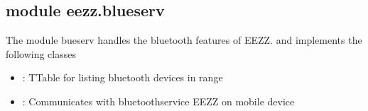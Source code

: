 \documentclass[letterpaper,10pt,english]{sphinxmanual}
\begin{document}
\subsection{module eezz.blueserv}
\label{\detokenize{eezz:module-eezz.blueserv}}\label{\detokenize{eezz:module-eezz-blueserv}}
\sphinxAtStartPar
The module bueserv handles the bluetooth features of EEZZ.
and implements the following classes
\begin{itemize}
\item {} 
\sphinxAtStartPar
{}:        TTable for listing bluetooth devices in range

\item {} 
\sphinxAtStartPar
{}: Communicates with bluetooth\sphinxhyphen{}service EEZZ on mobile device

\end{itemize}
\end{document}
